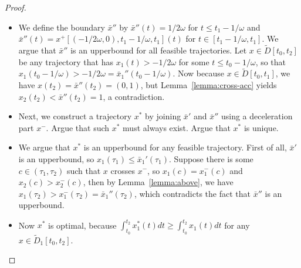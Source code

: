 \documentclass[a4paper]{article}
\theoremstyle{definition}
\theoremstyle{plain}
\begin{document}
\begin{proof}
  \phantom{.}
  \begin{itemize}
    \item We define the boundary $\bar{x}''$ by $\bar{x}''(t) = 1/2\omega$ for
          $t \leq t_{1} - 1/\omega$ and
          $\bar{x}''(t) = x^{+}[(-1/2\omega, 0), t_{1} - 1/\omega, t_{1}](t)$
          for $t \in [t_{1} - 1/\omega, t_{1}]$. We argue that $\bar{x}''$ is an
          upperbound for all feasible trajectories. Let
          $x \in \widetilde{D}[t_{0}, t_{2}]$ be any trajectory that has
          $x_{1}(t) > -1/2\omega$ for some $t \leq t_{0} - 1/\omega$, so that
          $x_{1}(t_{0} - 1/\omega) > -1/2\omega = \bar{x}_{1}''(t_{0} - 1/\omega)$.
          Now because $x \in \widetilde{D}[t_{0}, t_{1}]$, we have
          $x(t_{2}) = \bar{x}''(t_{2}) = (0, 1)$, but
          Lemma~\ref{lemma:cross-acc} yields
          $x_{2}(t_{2}) < \bar{x}''(t_{2}) = 1$, a contradiction.

    \item Next, we construct a trajectory $x^{*}$ by joining $\bar{x}'$ and
          $\bar{x}''$ using a deceleration part $x^{-}$. Argue that such $x^{*}$
          must always exist. Argue that $x^{*}$ is unique.

    \item We argue that $x^{*}$ is an upperbound for any feasible trajectory.
          First of all, $\bar{x}'$ is an upperbound, so
          $x_{1}(\tau_{1}) \leq \bar{x}_{1}'(\tau_{1})$. Suppose there is some
          $c \in (\tau_{1}, \tau_{2})$ such that $x$ crosses $x^{-}$, so
          $x_{1}(c) = x_{1}^{-}(c)$ and $x_{2}(c) > x_{2}^{-}(c)$, then by
          Lemma~\ref{lemma:above}, we have
          $x_{1}(\tau_{2}) > x^{-}_{1}(\tau_{2}) = \bar{x}_{1}''(\tau_{2})$,
          which contradicts the fact that $\bar{x}''$ is an upperbound.

    \item Now $x^{*}$ is optimal, because
          $\int_{t_{0}}^{t_{2}} x_{1}^{*}(t)dt \geq \int_{t_{0}}^{t_{2}} x_{1}(t) dt$
          for any $x \in \widetilde{D}_{1}[t_{0}, t_{2}]$.


  \end{itemize}
\end{proof}
\end{document}
